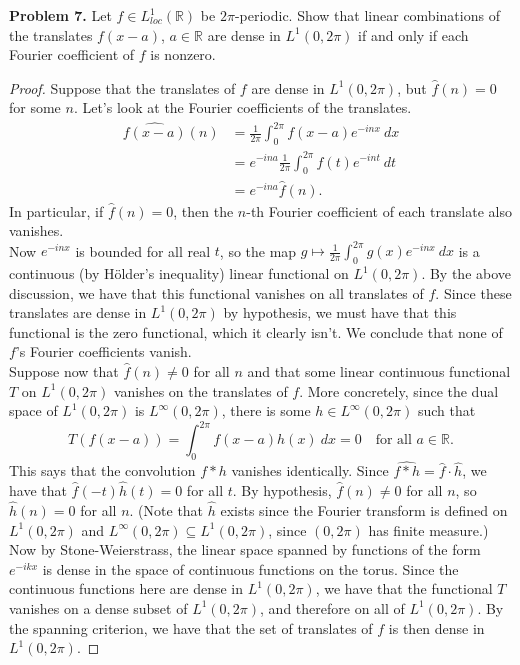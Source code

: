 \documentclass[11pt,letterpaper]{report}
\newcommand{\reals}{\mathbb{R}}
\begin{document}
\noindent\textbf{Problem 7. }
Let $f\in L^1_{loc}(\reals)$ be $2\pi$-periodic. Show that linear combinations of the translates $f(x-a)$, $a\in \reals$ are dense in $L^1(0, 2\pi)$ if and only if each Fourier coefficient of $f$ is nonzero.
\begin{proof}
	Suppose that the translates of $f$ are dense in $L^1(0, 2\pi)$, but $\widehat{f}(n) = 0$ for some $n$. Let's look at the Fourier coefficients of the translates.
	\begin{align*}
	\widehat{f(x-a)}(n) &= \frac{1}{2\pi}\int_0^{2\pi}f(x-a)e^{-inx}\ dx\\
	&= e^{-ina}\frac{1}{2\pi}\int_0^{2\pi}f(t)e^{-int}\ dt\\
	&= e^{-ina}\widehat{f}(n).
	\end{align*}
	In particular, if $\widehat{f}(n) = 0$, then the $n$-th Fourier coefficient of each translate also vanishes.\\

	\noindent Now $e^{-inx}$ is bounded for all real $t$, so the map $g\mapsto \frac{1}{2\pi}\int_0^{2\pi}g(x)e^{-inx}\ dx$ is a continuous (by H\"older's inequality) linear functional on $L^1(0, 2\pi)$. By the above discussion, we have that this functional vanishes on all translates of $f$. Since these translates are dense in $L^1(0, 2\pi)$ by hypothesis, we must have that this functional is the zero functional, which it clearly isn't. We conclude that none of $f$'s Fourier coefficients vanish.\\

	\noindent Suppose now that $\widehat{f}(n)\neq 0$ for all $n$ and that some linear continuous functional $T$ on $L^1(0,2\pi)$ vanishes on the translates of $f$. More concretely, since the dual space of $L^1(0,2\pi)$ is $L^\infty(0,2\pi)$, there is some $h\in L^\infty(0,2\pi)$ such that
	\[
	T(f(x-a)) = \int_0^{2\pi}f(x-a)h(x)\ dx = 0\quad\text{for all }a\in \reals.
	\]
	This says that the convolution $f*h$ vanishes identically. Since $\widehat{f*h} = \widehat{f}\cdot\widehat{h}$, we have that $\widehat{f}(-t)\widehat{h}(t) = 0$ for all $t$. By hypothesis, $\widehat{f}(n)\neq 0$ for all $n$, so $\widehat{h}(n) = 0$ for all $n$. (Note that $\widehat{h}$ exists since the Fourier transform is defined on $L^1(0,2\pi)$ and $L^\infty(0,2\pi)\subseteq L^1(0,2\pi)$, since $(0,2\pi)$ has finite measure.)\\

	\noindent Now by Stone-Weierstrass, the linear space spanned by functions of the form $e^{-ikx}$ is dense in the space of continuous functions on the torus. Since the continuous functions here are dense in $L^1(0,2\pi)$, we have that the functional $T$ vanishes on a dense subset of $L^1(0,2\pi)$, and therefore on all of $L^1(0,2\pi)$. By the spanning criterion, we have that the set of translates of $f$ is then dense in $L^1(0,2\pi)$.
\end{proof}
\end{document}
